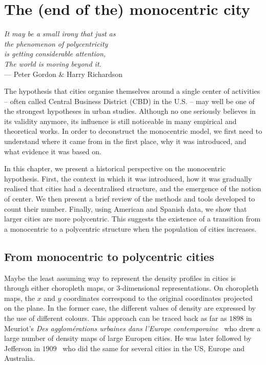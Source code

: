 %
\chapter{The (end of the) monocentric city}
\label{chap:monocentric_introduction}

\begin{flushright}{\slshape    
It may be a small irony that  
just as\\
the phenomenon of polycentricity\\ is getting considerable attention,\\
The world is moving beyond it.} \\ \medskip
--- Peter Gordon \& Harry Richardson~\cite{Gordon:1996}
\end{flushright}


\bigskip


The hypothesis that cities organise themselves around a single center of
activities -- often called Central Business District (CBD) in the U.S. -- may well
be one of the strongest hypotheses in urban studies. Although no one seriously
believes in its validity anymore, its influence is still noticeable in many empirical and theoretical works.  In order to deconstruct the
monocentric model, we first need to understand where it came from in the first
place, why it was introduced, and what evidence it was based on. 

In this chapter, we present a historical perspective on the monocentric
hypothesis. First, the context in which it was introduced, how it was gradually
realised that cities had a decentralised structure, and the emergence of the
notion of center. We then present a brief review of the methods and tools
developed to count their number. Finally, using American and Spanish data, we
show that larger cities are more polycentric. This suggests the existence of a
transition from a monocentric to a polycentric structure when the population of
cities increases.

\section{From monocentric to polycentric cities}
\label{sec:introduction}

Maybe the least assuming way to represent the density profiles in cities is
through either choropleth maps, or 3-dimensional representations. On choropleth
maps, the $x$ and $y$ coordinates correspond to the original coordinates
projected on the plane. In the former case, the different values of density are
expressed by the use of different colours. This approach can be traced back as
far as $1898$ in Meuriot's \emph{Des agglom\'erations urbaines dans l'Europe
contemporaine}~\cite{Meuriot:1898} who drew a large number of density maps of
large Europen cities. He was later followed by Jefferson in
$1909$~\cite{Jefferson:1909} who did the same for several cities in the US,
Europe and Australia.\\


